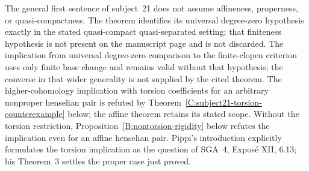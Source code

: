 The general first sentence of subject~21 does not assume affineness, properness, or quasi-compactness. The theorem identifies its universal degree-zero hypothesis exactly in the stated quasi-compact quasi-separated setting; that finiteness hypothesis is not present on the manuscript page and is not discarded. The implication from universal degree-zero comparison to the finite-clopen criterion uses only finite base change and remains valid without that hypothesis; the converse in that wider generality is not supplied by the cited theorem. The higher-cohomology implication with torsion coefficients for an arbitrary nonproper henselian pair is refuted by Theorem~\ref{C:subject21-torsion-counterexample} below; the affine theorem retains its stated scope. Without the torsion restriction, Proposition~\ref{B:nontorsion-rigidity} below refutes the implication even for an affine henselian pair. Pippi's introduction explicitly formulates the torsion implication as the question of SGA~4, Expos\'e XII, 6.13; his Theorem~3 settles the proper case just proved.

